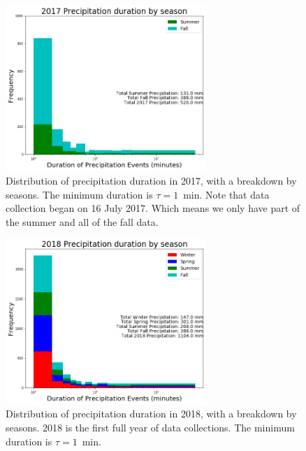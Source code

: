 \documentclass[11pt]{report}
\begin{document}
\clearpage
\begin{figure}[t]
  \centering
  \includegraphics[width=0.675\textwidth]{Figures/precip_2017.png}
  \caption[Precipitation histogram for 2017 broken down by
    season]{\label{p2017} Distribution of precipitation duration in 2017,
    with a breakdown by seasons. The minimum duration is $\tau = 1$~min.
    Note that data collection began on 16 July 2017. Which means we only
    have part of the summer and all of the fall data.  }
\end{figure}
\begin{figure}[b]
  \centering
  \includegraphics[width=0.675\textwidth]{Figures/precip_2018.png}
  \caption[Precipitation histogram for 2018 broken down by
    season]{\label{p2018} Distribution of precipitation duration in 2018,
    with a breakdown by seasons. 2018 is the first full year of data
    collections. The minimum duration is $\tau = 1$~min.}
\end{figure}
\end{document}
